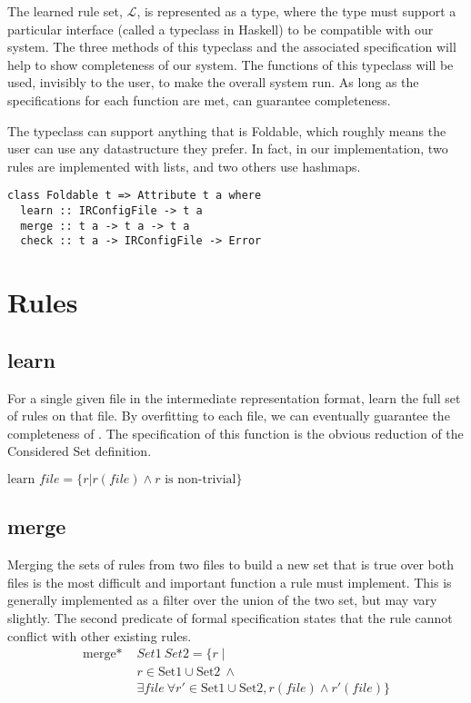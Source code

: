 The learned rule set, $\mathcal{L}$, is represented as a type, where the type must support a particular interface (called a typeclass in Haskell) to be compatible with our system.
The three methods of this typeclass and the associated specification will help to show completeness of our system.
The functions of this typeclass will be used, invisibly to the user, to make the overall system run.
As long as the specifications for each function are met, \app can guarantee completeness.

The typeclass can support anything that is Foldable, which roughly means the user can use any datastructure they prefer.
In fact, in our implementation, two rules are implemented with lists, and two others use hashmaps.

\begin{lstlisting}
class Foldable t => Attribute t a where
  learn :: IRConfigFile -> t a
  merge :: t a -> t a -> t a
  check :: t a -> IRConfigFile -> Error
\end{lstlisting}

\section{Rules}

\subsection{learn}
  For a single given file in the intermediate representation format, learn the full set of rules on that file.
  By overfitting to each file, we can eventually guarantee the completeness of \app.
  The specification of this function is the obvious reduction of the Considered Set definition.

  $\text{learn } file =  \{ r | r(file) \land r \text{ is non-trivial}\}$

\subsection{merge}
  Merging the sets of rules from two files to build a new set that is true over both files is the most difficult and important function a rule must implement.
  This is generally implemented as a filter over the union of the two set, but may vary slightly.
  The second predicate of formal specification states that the rule cannot conflict with other existing rules.
  \begin{align*}
  \text{merge* }& Set1 \: Set2= \{r \mid \\
    & r \in \text{Set1} \cup \text{Set2}\ \land \\
    & \exists file\ \forall r' \in \text{Set1} \cup \text{Set2}, r(file) \land r'(file) \} \\
  \end{align*}

